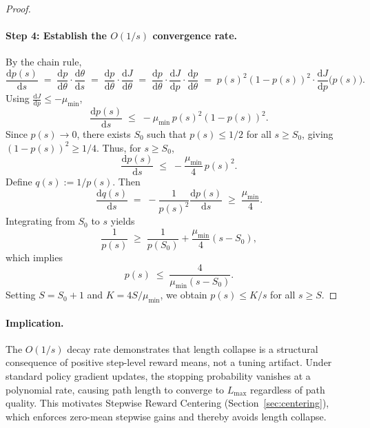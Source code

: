 \begin{proof}
\paragraph{Step 4: Establish the $O(1/s)$ convergence rate.} By the chain rule,
\begin{equation}
    \frac{\mathrm{d}p(s)}{\mathrm{d}s}
    \;=\; \frac{\mathrm{d}p}{\mathrm{d}\theta}\cdot \frac{\mathrm{d}\theta}{\mathrm{d}s}
    \;=\; \frac{\mathrm{d}p}{\mathrm{d}\theta}\cdot \frac{\mathrm{d}J}{\mathrm{d}\theta}
    \;=\; \frac{\mathrm{d}p}{\mathrm{d}\theta}\cdot \frac{\mathrm{d}J}{\mathrm{d}p}\cdot \frac{\mathrm{d}p}{\mathrm{d}\theta}
    \;=\; p(s)^2(1-p(s))^2\cdot \frac{\mathrm{d}J}{\mathrm{d}p}\bigl(p(s)\bigr).
\end{equation}
Using $\frac{\mathrm{d}J}{\mathrm{d}p} \leq -\mu_{\min}$,
\begin{equation}
    \frac{\mathrm{d}p(s)}{\mathrm{d}s}
    \;\leq\; -\mu_{\min}\, p(s)^2(1-p(s))^2.
\end{equation}
Since $p(s) \to 0$, there exists $S_0$ such that $p(s) \leq 1/2$ for all $s \geq S_0$, giving $(1-p(s))^2 \geq 1/4$. Thus, for $s \geq S_0$,
\begin{equation}
    \frac{\mathrm{d}p(s)}{\mathrm{d}s}
    \;\leq\; -\frac{\mu_{\min}}{4}\, p(s)^2.
\end{equation}
Define $q(s):=1/p(s)$. Then
\begin{equation}
    \frac{\mathrm{d}q(s)}{\mathrm{d}s}
    \;=\; -\frac{1}{p(s)^2}\frac{\mathrm{d}p(s)}{\mathrm{d}s}
    \;\geq\; \frac{\mu_{\min}}{4}.
\end{equation}
Integrating from $S_0$ to $s$ yields
\begin{equation}
    \frac{1}{p(s)} \;\geq\; \frac{1}{p(S_0)} + \frac{\mu_{\min}}{4}(s - S_0),
\end{equation}
which implies
\begin{equation}
    p(s) \;\leq\; \frac{4}{\mu_{\min}(s - S_0)}.
\end{equation}
Setting $S = S_0 + 1$ and $K = 4S/\mu_{\min}$, we obtain $p(s) \leq K/s$ for all $s \geq S$.
\end{proof}

\paragraph{Implication.} The $O(1/s)$ decay rate demonstrates that length collapse is a structural consequence of positive step-level reward means, not a tuning artifact. Under standard policy gradient updates, the stopping probability vanishes at a polynomial rate, causing path length to converge to $L_{\max}$ regardless of path quality. This motivates Stepwise Reward Centering (Section~\ref{sec:centering}), which enforces zero-mean stepwise gains and thereby avoids length collapse.


